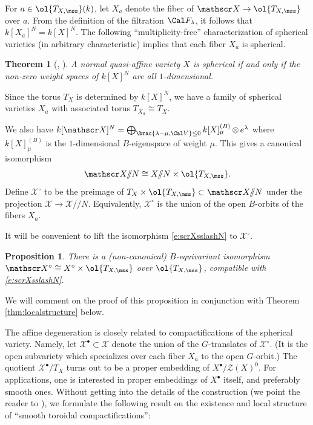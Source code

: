 \documentclass[final]{amsart}
\newtheorem{thm}[subsubsection]{Theorem}
\newtheorem{prop}[subsubsection]{Proposition}
\theoremstyle{remark}
\theoremstyle{definition}
\DeclareMathOperator*{\ot}{\otimes}
\numberwithin{equation}{section}
\begin{document}
\subsubsection{} 
For $a \in \ol{T_{X,\mss}}(k)$, let $X_a$ denote the fiber of 
$\mathscr X \to \ol{T_{X,\mss}}$ over $a$. 
From the definition of the filtration $\Cal F_\lambda$, it follows that 
$k[X_a]^N = k[X]^N$. 
The following ``multiplicity-free'' characterization of spherical varieties (in arbitrary
characteristic) implies that each fiber $X_a$ is spherical.

\begin{thm}[{\cite{VinbergKimelfeld}, \cite[Theorem 25.1]{Timashev}}]
A normal quasi-affine variety $X$ is spherical if and only if 
the non-zero weight spaces of $k[X]^N$ are all $1$-dimensional.
\end{thm}

Since the torus $T_X$ is determined by $k[X]^N$, we have a family of spherical varieties
$X_a$ with associated torus $T_{X_a} \cong T_X$. 

We also have $k[\mathscr X]^N = \bigoplus_{\brac{\lambda-\mu,\Cal V}\le 0} k[X]^{(B)}_\mu \ot e^\lambda$ where $k[X]^{(B)}_\mu$ is the $1$-dimensional $B$-eigenspace of weight $\mu$. 
This gives a canonical isomorphism 
\begin{equation} \label{e:scrXsslashN} 
    \mathscr X/\!\!/N \cong X/\!\!/N \times \ol{T_{X,\mss}}. 
\end{equation}
Define $\mathscr X^\circ$ to be the preimage of 
$T_X \times \ol{T_{X,\mss}} \subset \mathscr X/\!\!/N$ under the projection
$\mathscr X \to \mathscr X/\!\!/N$. 
Equivalently, $\mathscr X^\circ$ is the union of the open $B$-orbits of the fibers $X_a$. 



It will be convenient to lift the isomorphism \eqref{e:scrXsslashN} to $\mathscr X^\circ$.
\begin{prop} \label{prop:noncanon-section}
There is a (non-canonical) $B$-equivariant isomorphism $\mathscr X^\circ \cong X^\circ \times \ol{T_{X,\mss}}$ over $\ol{T_{X,\mss}}$, compatible with \eqref{e:scrXsslashN}.
\end{prop}

We will comment on the proof of this proposition in conjunction with Theorem \ref{thm:localstructure} below. 

The affine degeneration is closely related to compactifications of the spherical variety. 
Namely, let $\mathscr X^\bullet \subset \mathscr X$ denote the union of the $G$-translates of $\mathscr X^\circ$. (It is the open subvariety which
specializes over each fiber $X_a$ to the open $G$-orbit.)
The quotient $\mathscr X^\bullet/ T_X$ turns out to be a proper embedding of $X^\bullet/\mathcal Z(X)^0$. For applications, one is interested in proper embeddings of $X^\bullet$ itself, and preferably smooth ones. Without getting into the details of the construction (we point the reader to \cite{KnLV}), we formulate the following result on the existence and local structure of ``smooth toroidal compactifications'':
\end{document}

